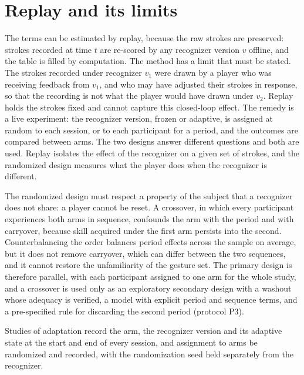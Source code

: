 \section{Replay and its limits}

The terms can be estimated by replay, because the raw strokes are preserved: strokes recorded at time $t$ are re-scored by any recognizer version $v$ offline, and the table is filled by computation. The method has a limit that must be stated. The strokes recorded under recognizer $v_1$ were drawn by a player who was receiving feedback from $v_1$, and who may have adjusted their strokes in response, so that the recording is not what the player would have drawn under $v_2$. Replay holds the strokes fixed and cannot capture this closed-loop effect. The remedy is a live experiment: the recognizer version, frozen or adaptive, is assigned at random to each session, or to each participant for a period, and the outcomes are compared between arms. The two designs answer different questions and both are used. Replay isolates the effect of the recognizer on a given set of strokes, and the randomized design measures what the player does when the recognizer is different.

The randomized design must respect a property of the subject that a recognizer does not share: a player cannot be reset. A crossover, in which every participant experiences both arms in sequence, confounds the arm with the period and with carryover, because skill acquired under the first arm persists into the second. Counterbalancing the order balances period effects across the sample on average, but it does not remove carryover, which can differ between the two sequences, and it cannot restore the unfamiliarity of the gesture set. The primary design is therefore parallel, with each participant assigned to one arm for the whole study, and a crossover is used only as an exploratory secondary design with a washout whose adequacy is verified, a model with explicit period and sequence terms, and a pre-specified rule for discarding the second period (protocol P3).

\begin{requirement}\label{req:assignment}
Studies of adaptation \must{} record the arm, the recognizer version and its adaptive state at the start and end of every session, and assignment to arms \must{} be randomized and recorded, with the randomization seed held separately from the recognizer.\evS
\end{requirement}

